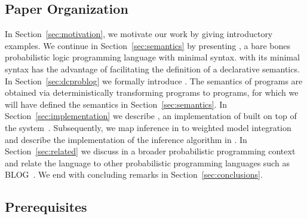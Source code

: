 











\subsection*{Paper Organization}
In Section~\ref{sec:motivation}, we motivate our work by giving introductory examples. We continue in Section~\ref{sec:semantics} by presenting \dcplpsty, a bare bones probabilistic logic programming language with minimal syntax.
\dcplpsty with its minimal syntax has the advantage of facilitating the definition of a declarative semantics. In Section~\ref{sec:dcproblog} we formally introduce \dcproblogsty.
The semantics of \dcproblogsty programs are obtained via deterministically transforming \dcproblogsty programs to \dcplpsty programs, for which we will have defined the semantics in Section~\ref{sec:semantics}.
In Section~\ref{sec:implementation} we describe \dcproblogsys, an implementation of \dcproblogsty built on top of the \problogsys system~\citep{fierens2015inference,dries2015problog2}.
Subsequently, we map inference in \dcproblogsty to weighted model integration ~\citep{belle2015probabilistic} and describe the implementation of the inference algorithm in \dcproblogsys. 
In Section~\ref{sec:related} we discuss \dcproblogsty in a broader probabilistic programming context and relate the language to other probabilistic programming languages such as BLOG~\citep{milch2005blog}.
We end with concluding remarks in Section~\ref{sec:conclusions}.




\subsection*{Prerequisites}


